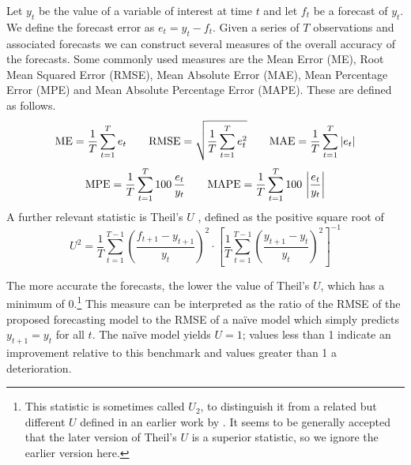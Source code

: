 Let $y_t$ be the value of a variable of interest at time $t$ and let
$f_t$ be a forecast of $y_t$.  We define the forecast error as
$e_t = y_t - f_t$.  Given a series of $T$ observations and associated
forecasts we can construct several measures of the overall accuracy of
the forecasts.  Some commonly used measures are the Mean Error (ME),
Root Mean Squared Error (RMSE), Mean Absolute Error (MAE), Mean
Percentage Error (MPE) and Mean Absolute Percentage Error (MAPE).
These are defined as follows.
%
\[ {\rm ME} = \frac{1}{T} \sum_{t=1}^T e_t \qquad 
   {\rm RMSE} = \sqrt{\frac{1}{T} \sum_{t=1}^T e_t^2} \qquad 
   {\rm MAE} = \frac{1}{T} \sum_{t=1}^T |e_t|
\] 
%
\[ {\rm MPE} = \frac{1}{T} \sum_{t=1}^T 100\, \frac{e_t}{y_t} \qquad
   {\rm MAPE} = \frac{1}{T} \sum_{t=1}^T 100\, \left|\frac{e_t}{y_t}\right| 
\]
%
A further relevant statistic is Theil's $U$ \citep{theil66}, defined as
the positive square root of
%
\[ 
U^2 = \frac{1}{T}
     \sum_{t=1}^{T-1} \left(\frac{f_{t+1} - y_{t+1}}{y_t}\right)^2
     \cdot \left[
     \frac{1}{T} \sum_{t=1}^{T-1} 
        \left(\frac{y_{t+1} - y_t}{y_t}\right)^2 \right]^{-1}
\]

The more accurate the forecasts, the lower the value of Theil's $U$,
which has a minimum of 0.\footnote{This statistic is sometimes called
  $U_2$, to distinguish it from a related but different $U$ defined in
  an earlier work by \cite{theil61}.  It seems to be generally accepted
  that the later version of Theil's $U$ is a superior statistic, so we
  ignore the earlier version here.} This measure can be interpreted as
the ratio of the RMSE of the proposed forecasting model to the RMSE of
a na\"ive model which simply predicts $y_{t+1} = y_t$ for all $t$.
The na\"ive model yields $U = 1$; values less than 1 indicate an
improvement relative to this benchmark and values greater than 1 a
deterioration.

